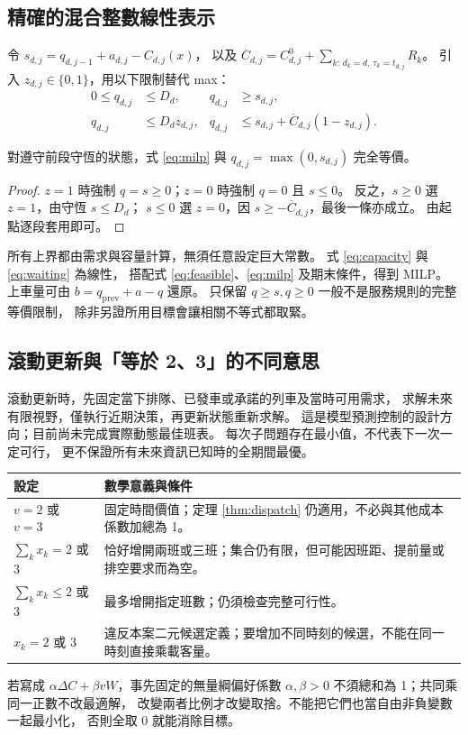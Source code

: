 \subsection{精確的混合整數線性表示}
令 $s_{d,j}=q_{d,j-1}+a_{d,j}-C_{d,j}(x)$，
以及 $\overline C_{d,j}=C^0_{d,j}+\sum_{k:\,d_k=d,\,\tau_k=t_{d,j}}R_k$。
引入 $z_{d,j}\in\{0,1\}$，用以下限制替代 max：
\begin{equation}
\begin{aligned}
0\le q_{d,j}&\le D_d, &q_{d,j}&\ge s_{d,j},\\
q_{d,j}&\le D_dz_{d,j}, &
q_{d,j}&\le s_{d,j}+\overline C_{d,j}(1-z_{d,j}).
\end{aligned}
\label{eq:milp}
\end{equation}
\begin{proposition}
對遵守前段守恆的狀態，式 \eqref{eq:milp} 與
$q_{d,j}=\max(0,s_{d,j})$ 完全等價。
\end{proposition}
\begin{proof}
$z=1$ 時強制 $q=s\ge0$；$z=0$ 時強制 $q=0$ 且 $s\le0$。
反之，$s\ge0$ 選 $z=1$，由守恆 $s\le D_d$；
$s\le0$ 選 $z=0$，因 $s\ge-\overline C_{d,j}$，最後一條亦成立。
由起點逐段套用即可。
\end{proof}
所有上界都由需求與容量計算，無須任意設定巨大常數。
式 \eqref{eq:capacity} 與 \eqref{eq:waiting} 為線性，
搭配式 \eqref{eq:feasible}、\eqref{eq:milp} 及期末條件，得到 MILP。
上車量可由 $b=q_{\mathrm{prev}}+a-q$ 還原。
只保留 $q\ge s,q\ge0$ 一般不是服務規則的完整等價限制，
除非另證所用目標會讓相關不等式都取緊。

\subsection{滾動更新與「等於 2、3」的不同意思}
滾動更新時，先固定當下排隊、已發車或承諾的列車及當時可用需求，
求解未來有限視野，僅執行近期決策，再更新狀態重新求解。
這是模型預測控制的設計方向；目前尚未完成實際動態最佳班表。
每次子問題存在最小值，不代表下一次一定可行，
更不保證所有未來資訊已知時的全期間最優。

\begin{table}[htbp]
\centering\small
\begin{tabularx}{\linewidth}{@{}p{35mm}X@{}}
\toprule
設定 & 數學意義與條件\\
\midrule
$v=2$ 或 $v=3$ & 固定時間價值；定理 \ref{thm:dispatch} 仍適用，不必與其他成本係數加總為 1。\\
$\sum_kx_k=2$ 或 $3$ & 恰好增開兩班或三班；集合仍有限，但可能因班距、提前量或排空要求而為空。\\
$\sum_kx_k\le2$ 或 $3$ & 最多增開指定班數；仍須檢查完整可行性。\\
$x_k=2$ 或 $3$ & 違反本案二元候選定義；要增加不同時刻的候選，不能在同一時刻直接乘載客量。\\
\bottomrule
\end{tabularx}
\end{table}
若寫成 $\alpha\Delta C+\beta vW$，事先固定的無量綱偏好係數
$\alpha,\beta>0$ 不須總和為 1；共同乘同一正數不改最適解，
改變兩者比例才改變取捨。不能把它們也當自由非負變數一起最小化，
否則全取 0 就能消除目標。

